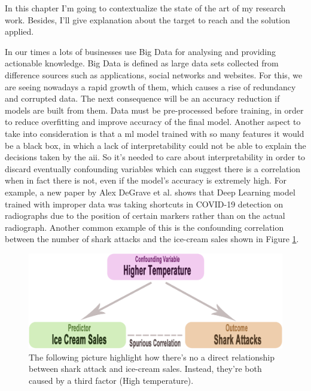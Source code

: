 In this chapter I'm going to contextualize the state of the art of my research work. 
Besides, I'll give explanation about the target to reach and the solution applied.\par
In our times a lots of businesses use Big Data for analysing and providing actionable knowledge.
Big Data is defined as large data sets collected from difference sources such as applications, social networks and websites.
For this, we are seeing nowadays a rapid growth of them, which causes a rise of redundancy and corrupted data.
The next consequence will be an accuracy reduction if models are built from them.
Data must be pre-processed before training, in order to reduce overfitting and improve accuracy of the final model.\newline
Another aspect to take into consideration is that a \acrshort{ml} model trained with so many features it would be a black box, in which a lack of interpretability could not be able to explain the decisions taken by the \gls{aii}.
So it's needed to care about interpretability in order to discard eventually confounding variables  which can suggest there is a correlation when in fact there is not, even if the model's accuracy is extremely high.
For example, a new paper by Alex DeGrave et al.\cite{degrave2021ai} shows that Deep Learning model trained with improper data was taking shortcuts in COVID-19 detection on radiographs due to the position of certain markers rather than on the actual radiograph.
Another common example of this is the confounding correlation between the number of shark attacks and the ice-cream sales shown in Figure \ref{fig:shark}.\newline
\begin{figure}[H]
    \centering
    \includegraphics[scale=0.25]{images/confounding.png}
    \caption{The following picture\cite{shark-icecream} highlight how there's no a direct relationship between shark attack and ice-cream sales. Instead, they're both caused by a third factor (High temperature)\cite{siegel2019ice}.}
    \label{fig:shark}
\end{figure}
